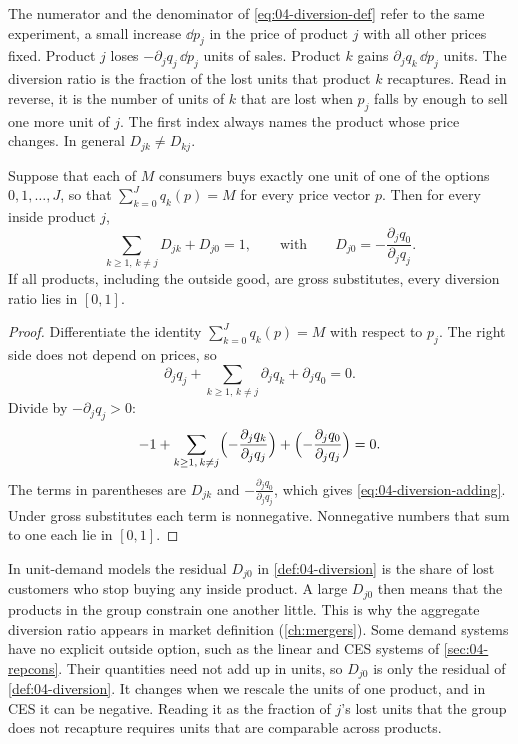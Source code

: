 The numerator and the denominator of \eqref{eq:04-diversion-def} refer to the same experiment, a small
increase $\dd p_j$ in the price of product $j$ with all other prices fixed. Product $j$ loses
$-\partial_j q_j \, \dd p_j$ units of sales. Product $k$ gains $\partial_j q_k\, \dd p_j$ units. The diversion
ratio is the fraction of the lost units that product $k$ recaptures. Read in reverse, it is the number of
units of $k$ that are lost when $p_j$ falls by enough to sell one more unit of $j$. The first index always
names the product whose price changes. In general $D_{jk} \neq D_{kj}$.

\begin{proposition}[Adding up]\label{prop:04-diversion-adding}
Suppose that each of $M$ consumers buys exactly one unit of one of the options $0, 1, \dots, J$, so that
$\sum_{k=0}^J q_k(p) = M$ for every price vector $p$. Then for every inside product $j$,
\begin{equation}\label{eq:04-diversion-adding}
  \sum_{k \ge 1,\, k \neq j} D_{jk} + D_{j0} = 1, \qquad\text{with}\qquad D_{j0} = -\frac{\partial_j q_0}{\partial_j q_j}.
\end{equation}
If all products, including the outside good, are gross substitutes, every diversion ratio lies in $[0,1]$.
\end{proposition}

\begin{proof}
Differentiate the identity $\sum_{k=0}^J q_k(p) = M$ with respect to $p_j$. The right side does not depend
on prices, so
\[
  \partial_j q_j + \sum_{k \ge 1,\, k \neq j}\partial_j q_k + \partial_j q_0 = 0.
\]
Divide by $-\partial_j q_j > 0$:
\[
  -1 + \sum_{k \ge 1,\, k\neq j}\Bigl(-\frac{\partial_j q_k}{\partial_j q_j}\Bigr) + \Bigl(-\frac{\partial_j q_0}{\partial_j q_j}\Bigr) = 0.
\]
The terms in parentheses are $D_{jk}$ and $-\frac{\partial_j q_0}{\partial_j q_j}$, which gives
\eqref{eq:04-diversion-adding}. Under gross substitutes each term is nonnegative. Nonnegative numbers
that sum to one each lie in $[0,1]$.
\end{proof}

In unit-demand models the residual $D_{j0}$ in \cref{def:04-diversion} is the share of lost customers who
stop buying any inside product. A large $D_{j0}$ then means that the products in the group constrain one
another little. This is why the aggregate diversion ratio appears in market definition (\cref{ch:mergers}).
Some demand systems have no explicit outside option, such as the linear and CES systems of
\cref{sec:04-repcons}. Their quantities need not add up in units, so $D_{j0}$ is only the residual of
\cref{def:04-diversion}. It changes when we rescale the units of one product, and in CES it can be negative.
Reading it as the fraction of $j$'s lost units that the group does not recapture requires units that are
comparable across products.

